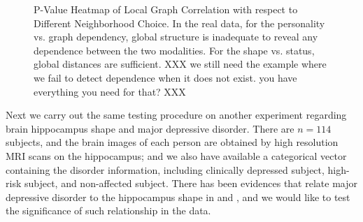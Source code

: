 \documentclass[11pt]{article}
\begin{document}
\begin{figure}[htbp]
\centering
{}
\hfil
\centering
{}
\hfil
\centering
{}
\caption{P-Value Heatmap of Local Graph Correlation with respect to Different Neighborhood Choice.  In the real data, for the personality vs. graph dependency, global structure is inadequate to reveal any dependence between the two modalities.  For the shape vs. status,  global distances are sufficient.  XXX we still need the example where we fail to detect dependence when it does not exist.  you have everything you need for that? XXX}
\label{figReal}
\end{figure}

Next we carry out the same testing procedure on another experiment regarding brain hippocampus shape and major depressive disorder. There are $n=114$ subjects, and the brain images of each person are obtained by high resolution MRI scans on the hippocampus; and we also have available a categorical vector containing the disorder information, including clinically depressed subject, high-risk subject, and non-affected subject. There has been evidences that relate major depressive disorder to the hippocampus shape in \cite{ParkEtAl2011} and \cite{PosenerEtAl2003}, and we would like to test the significance of such relationship in the data. 
\end{document}
